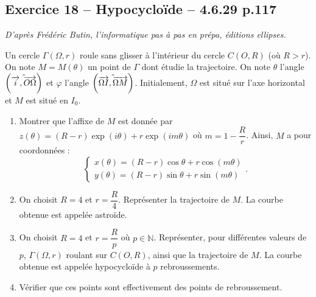 \documentclass[10pt,fleqn]{article} %
\begin{document}
\begin{multicols}{2}
\subsection*{Exercice 18 -- Hypocycloïde -- 4.6.29 p.117}
\begin{flushright}
\textit{D'après Frédéric Butin, l'informatique pas à pas en prépa, éditions ellipses.}
\end{flushright}

Un cercle $ \Gamma\left(\Omega,r\right)$ roule sans glisser à l'intérieur du cercle $C\left(O,R\right)$ (où $R>r$). On note $M=M(\theta)$ un point de $\Gamma$ dont étudie la trajectoire. On note $\theta$ l'angle $\left( \hat{\overrightarrow{i},\overrightarrow{O\Omega}}\right)$ et $\varphi$ l'angle $\left( \hat{\overrightarrow{\Omega I},\overrightarrow{\Omega M}}\right)$. Initialement, $\Omega$ est situé sur l'axe horizontal et $M$ est situé en $I_0$.

\begin{center}
\end{center}

\begin{enumerate}
\item Montrer que l'affixe de $M$ est donnée par $z(\theta)=\left(R-r\right) \exp\left(i\theta \right) + r \exp\left(i  m \theta \right)$ où $m=1-\dfrac{R}{r}$. Ainsi, $M$ a pour coordonnées :
$$
\left\{
\begin{array}{l}
x(\theta)= \left(R-r\right) \cos \theta +r \cos \left(m \theta \right) \\
y(\theta)= \left(R-r\right) \sin \theta +r \sin \left(m \theta \right) 
\end{array}
\right. .
$$
\item On choisit $R=4$ et $r=\dfrac{R}{4}$. Représenter la trajectoire de $M$. La courbe obtenue est appelée astroïde. 
\item On choisit $R=4$ et $r=\dfrac{R}{p}$ où $p\in \mathbb{N}$. Représenter, pour différentes valeurs de $p$, $\Gamma\left(\Omega,r\right)$ roulant sur $C\left(O,R\right)$, ainsi que la trajectoire de $M$. La courbe obtenue est appelée hypocycloïde à $p$ rebroussements. 
\item Vérifier que ces points sont effectivement des points de rebroussement.
\end{enumerate}



\end{multicols}
\end{document}

